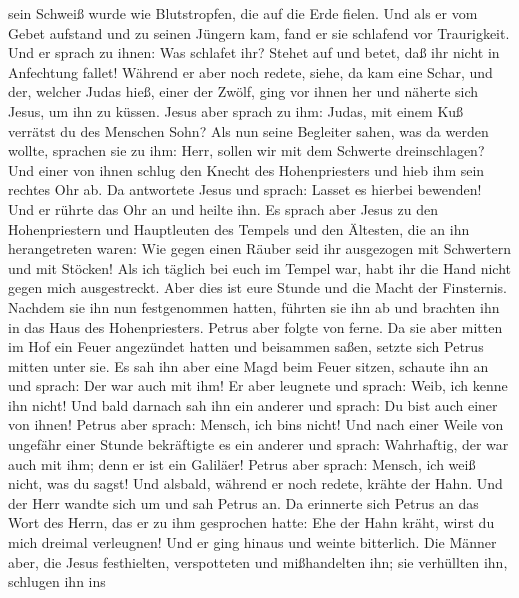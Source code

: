 sein Schweiß wurde wie Blutstropfen, die auf die Erde fielen.
 Und als er vom Gebet aufstand und zu seinen Jüngern kam,
fand er sie schlafend vor Traurigkeit.  Und er sprach zu
ihnen: Was schlafet ihr? Stehet auf und betet, daß ihr nicht in
Anfechtung fallet!  Während er aber noch redete, siehe,
da kam eine Schar, und der, welcher Judas hieß, einer der Zwölf, ging
vor ihnen her und näherte sich Jesus, um ihn zu küssen. 
Jesus aber sprach zu ihm: Judas, mit einem Kuß verrätst du des Menschen
Sohn?  Als nun seine Begleiter sahen, was da werden
wollte, sprachen sie zu ihm: Herr, sollen wir mit dem Schwerte
dreinschlagen?  Und einer von ihnen schlug den Knecht des
Hohenpriesters und hieb ihm sein rechtes Ohr ab.  Da
antwortete Jesus und sprach: Lasset es hierbei bewenden! Und er rührte
das Ohr an und heilte ihn.  Es sprach aber Jesus zu den
Hohenpriestern und Hauptleuten des Tempels und den Ältesten, die an ihn
herangetreten waren: Wie gegen einen Räuber seid ihr ausgezogen mit
Schwertern und mit Stöcken!  Als ich täglich bei euch im
Tempel war, habt ihr die Hand nicht gegen mich ausgestreckt. Aber dies
ist eure Stunde und die Macht der Finsternis.  Nachdem
sie ihn nun festgenommen hatten, führten sie ihn ab und brachten ihn in
das Haus des Hohenpriesters. Petrus aber folgte von ferne.
 Da sie aber mitten im Hof ein Feuer angezündet hatten
und beisammen saßen, setzte sich Petrus mitten unter sie.
 Es sah ihn aber eine Magd beim Feuer sitzen, schaute ihn
an und sprach: Der war auch mit ihm!  Er aber leugnete
und sprach: Weib, ich kenne ihn nicht!  Und bald darnach
sah ihn ein anderer und sprach: Du bist auch einer von ihnen! Petrus
aber sprach: Mensch, ich bin\textquotesingle s nicht! 
Und nach einer Weile von ungefähr einer Stunde bekräftigte es ein
anderer und sprach: Wahrhaftig, der war auch mit ihm; denn er ist ein
Galiläer!  Petrus aber sprach: Mensch, ich weiß nicht,
was du sagst! Und alsbald, während er noch redete, krähte der Hahn.
 Und der Herr wandte sich um und sah Petrus an. Da
erinnerte sich Petrus an das Wort des Herrn, das er zu ihm gesprochen
hatte: Ehe der Hahn kräht, wirst du mich dreimal verleugnen!
 Und er ging hinaus und weinte bitterlich.
 Die Männer aber, die Jesus festhielten, verspotteten und
mißhandelten ihn;  sie verhüllten ihn, schlugen ihn ins

